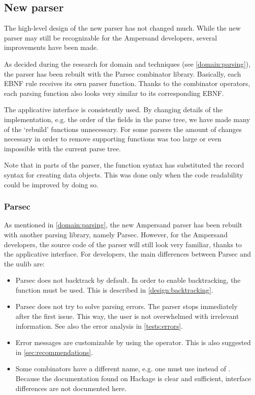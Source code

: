 
\subsection{New parser}
\label{design:new-parser}
The high-level design of the new parser has not changed much.
While the new parser may still be recognizable for the Ampersand developers, several improvements have been made.

As decided during the research for domain and techniques (see \autoref{domain:parsing}), the parser has been rebuilt with the Parsec combinator library.
Basically, each EBNF rule receives its own parser function.
Thanks to the combinator operators, each parsing function also looks very similar to its corresponding EBNF.

The applicative interface is consistently used.
By changing details of the implementation, e.g. the order of the fields in the parse tree, we have made many of the `rebuild' functions unnecessary.
For some parsers the amount of changes necessary in order to remove supporting functions was too large or even impossible with the current parse tree.

Note that in parts of the parser, the function syntax has substituted the record syntax for creating data objects.
This was done only when the code readability could be improved by doing so.

\subsubsection{Parsec}
\label{design:parsing-lib}
As mentioned in \autoref{domain:parsing}, the new Ampersand parser has been rebuilt with another parsing library, namely Parsec.
However, for the Ampersand developers, the source code of the parser will still look very familiar, thanks to the applicative interface.
For developers, the main differences between Parsec and the uulib are:
\begin{itemize}
  \item Parsec does not backtrack by default.
    In order to enable backtracking, the  function must be used.
    This is described in \autoref{design:backtracking}.
  \item Parsec does not try to solve parsing errors.
    The parser stops immediately after the first issue.
   This way, the user is not overwhelmed with irrelevant information.
    See also the error analysis in \autoref{tests:errors}.
  \item Error messages are customizable by using the  operator.
    This is also suggested in \autoref{sec:recommendations}.
  \item Some combinators have a different name, e.g. one must use  instead of .
    Because the documentation found on Hackage is clear and sufficient, interface differences are not documented here.
\end{itemize}

